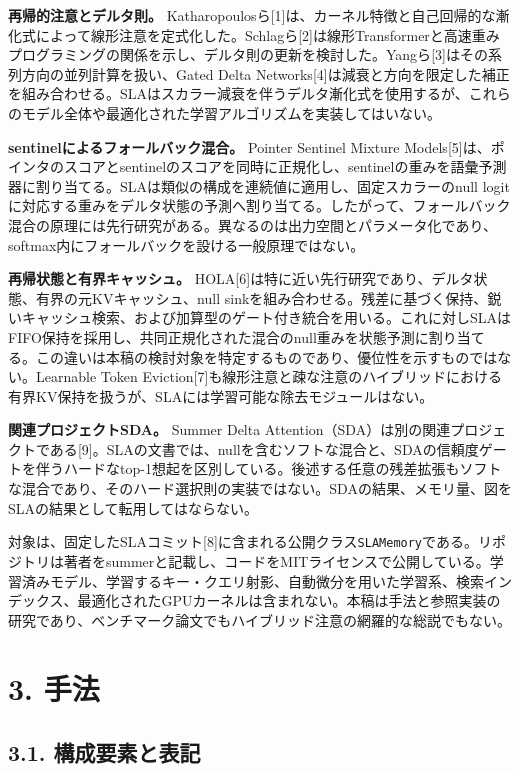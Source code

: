 \documentclass[11pt,a4paper]{article}
\begin{document}
\textbf{再帰的注意とデルタ則。} Katharopoulosら{[}1{]}は、カーネル特徴と自己回帰的な漸化式によって線形注意を定式化した。Schlagら{[}2{]}は線形Transformerと高速重みプログラミングの関係を示し、デルタ則の更新を検討した。Yangら{[}3{]}はその系列方向の並列計算を扱い、Gated Delta Networks{[}4{]}は減衰と方向を限定した補正を組み合わせる。SLAはスカラー減衰を伴うデルタ漸化式を使用するが、これらのモデル全体や最適化された学習アルゴリズムを実装してはいない。

\textbf{sentinelによるフォールバック混合。} Pointer Sentinel Mixture Models{[}5{]}は、ポインタのスコアとsentinelのスコアを同時に正規化し、sentinelの重みを語彙予測器に割り当てる。SLAは類似の構成を連続値に適用し、固定スカラーのnull logitに対応する重みをデルタ状態の予測へ割り当てる。したがって、フォールバック混合の原理には先行研究がある。異なるのは出力空間とパラメータ化であり、softmax内にフォールバックを設ける一般原理ではない。

\textbf{再帰状態と有界キャッシュ。} HOLA{[}6{]}は特に近い先行研究であり、デルタ状態、有界の元KVキャッシュ、null sinkを組み合わせる。残差に基づく保持、鋭いキャッシュ検索、および加算型のゲート付き統合を用いる。これに対しSLAはFIFO保持を採用し、共同正規化された混合のnull重みを状態予測に割り当てる。この違いは本稿の検討対象を特定するものであり、優位性を示すものではない。Learnable Token Eviction{[}7{]}も線形注意と疎な注意のハイブリッドにおける有界KV保持を扱うが、SLAには学習可能な除去モジュールはない。

\textbf{関連プロジェクトSDA。} Summer Delta Attention（SDA）は別の関連プロジェクトである{[}9{]}。SLAの文書では、nullを含むソフトな混合と、SDAの信頼度ゲートを伴うハードなtop-1想起を区別している。後述する任意の残差拡張もソフトな混合であり、そのハード選択則の実装ではない。SDAの結果、メモリ量、図をSLAの結果として転用してはならない。

対象は、固定したSLAコミット{[}8{]}に含まれる公開クラス\texttt{SLAMemory}である。リポジトリは著者をsummerと記載し、コードをMITライセンスで公開している。学習済みモデル、学習するキー・クエリ射影、自動微分を用いた学習系、検索インデックス、最適化されたGPUカーネルは含まれない。本稿は手法と参照実装の研究であり、ベンチマーク論文でもハイブリッド注意の網羅的な総説でもない。

\section{3. 手法}\label{ux624bux6cd5}

\subsection{3.1. 構成要素と表記}\label{ux69cbux6210ux8981ux7d20ux3068ux8868ux8a18}
\end{document}
